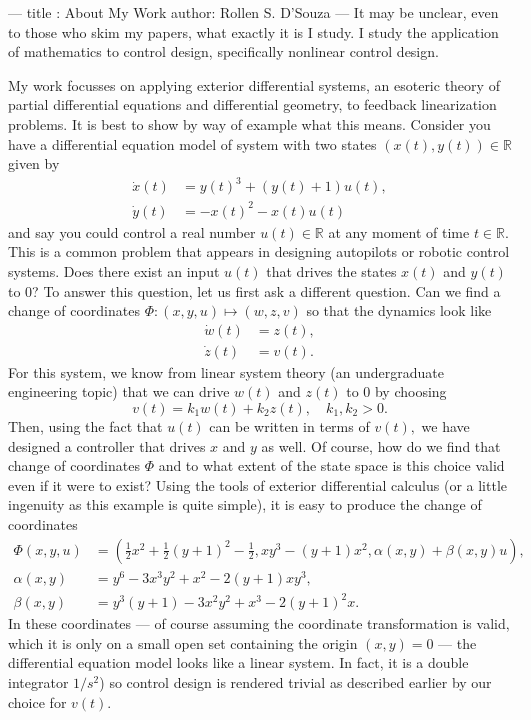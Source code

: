 ---
title : About My Work
author: Rollen S. D'Souza
---
It may be unclear, even to those who skim my papers, what exactly it is I study.
I study the application of mathematics to control design, specifically nonlinear control design.

My work focusses on applying exterior differential systems, an esoteric theory of partial differential equations and differential geometry, to feedback linearization problems.
It is best to show by way of example what this means.
Consider you have a differential equation model of system with two states \((x(t), y(t))\in\mathbb{R}\) given by
\[
\begin{aligned}
  \dot{x}(t) &= y(t)^3 + (y(t) + 1) u(t),\\
  \dot{y}(t) &= -x(t)^2 - x(t) u(t)
\end{aligned}
\]
and say you could control a real number \(u(t)\in\mathbb{R}\) at any moment of time \(t \in \mathbb{R}.\)
This is a common problem that appears in designing autopilots or robotic control systems.
Does there exist an input \(u(t)\) that drives the states \(x(t)\) and \(y(t)\) to \(0\)?
To answer this question, let us first ask a different question.
Can we find a change of coordinates \(\Phi: (x,y,u) \mapsto (w,z,v)\) so that the dynamics look like
\[
\begin{aligned}
  \dot{w}(t) &= z(t),\\
  \dot{z}(t) &= v(t).
\end{aligned}
\]
For this system, we know from linear system theory (an undergraduate engineering topic) that we can drive \(w(t)\) and \(z(t)\) to \(0\) by choosing
\[
  v(t) = k_1 w(t) + k_2 z(t),\quad k_1, k_2 > 0.
\]
Then, using the fact that \(u(t)\) can be written in terms of \(v(t),\) we have designed a controller that drives \(x\) and \(y\) as well.
Of course, how do we find that change of coordinates \(\Phi\) and to what extent of the state space is this choice valid even if it were to exist?
Using the tools of exterior differential calculus (or a little ingenuity as this example is quite simple), it is easy to produce the change of coordinates
\[
\begin{aligned}
  \Phi(x,y,u) &=
    \left(
      \frac{1}{2}x^2 + \frac{1}{2}(y+1)^2 - \frac{1}{2},
      x y^3 - (y + 1) x^2,
      \alpha(x,y) + \beta(x,y) u
    \right),\\
  \alpha(x,y) &= 
    y^6
    - 3 x^3 y^2
    + x^2
    - 2 (y + 1) x y^3,\\
  \beta(x,y) &=
    y^3 (y + 1)
    - 3 x^2 y^2
    + x^3
    - 2 (y + 1)^2 x.
\end{aligned}
\]
In these coordinates --- of course assuming the coordinate transformation is valid, which it is only on a small open set containing the origin \((x,y) = 0\) --- the differential equation model looks like a linear system.
In fact, it is a double integrator \(1/s^2\)) so control design is rendered trivial as described earlier by our choice for \(v(t)\).

